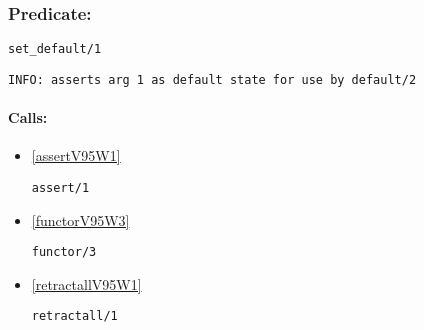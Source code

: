 \subsubsection{Predicate:} \label{setV95WdefaultV95W1}

\begin{verbatim}
set_default/1
\end{verbatim}

{\small \begin{verbatim}
INFO: asserts arg 1 as default state for use by default/2

\end{verbatim}}
\paragraph{Calls:} 
\begin{itemize}
\item \ref{assertV95W1} 
\begin{verbatim}
assert/1
\end{verbatim}

\item \ref{functorV95W3} 
\begin{verbatim}
functor/3
\end{verbatim}

\item \ref{retractallV95W1} 
\begin{verbatim}
retractall/1
\end{verbatim}

\end{itemize}
